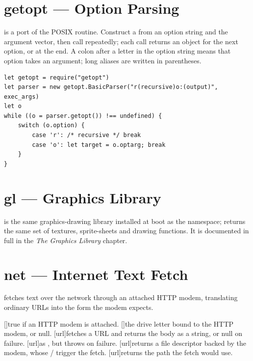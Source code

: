 \section{getopt --- Option Parsing}

 is a port of the POSIX  routine. Construct a  from an option string and the argument vector, then call  repeatedly; each call returns an object  for the next option, or  at the end. A colon after a letter in the option string means that option takes an argument; long aliases are written in parentheses.

\begin{lstlisting}
let getopt = require("getopt")
let parser = new getopt.BasicParser("r(recursive)o:(output)", exec_args)
let o
while ((o = parser.getopt()) !== undefined) {
    switch (o.option) {
        case 'r': /* recursive */ break
        case 'o': let target = o.optarg; break
    }
}
\end{lstlisting}

\section{gl --- Graphics Library}

 is the same graphics-drawing library installed at boot as the  namespace;  returns the same set of textures, sprite-sheets and drawing functions. It is documented in full in the \emph{The Graphics Library} chapter.

\section{net --- Internet Text Fetch}

 fetches text over the network through an attached HTTP modem, translating ordinary URLs into the form the modem expects.

\begin{outline}
\1[]{true if an HTTP modem is attached.}
\1[]{the drive letter bound to the HTTP modem, or null.}
\1[url]{fetches a URL and returns the body as a string, or null on failure.}
\1[url]{as , but throws on failure.}
\1[url]{returns a file descriptor backed by the modem, whose / trigger the fetch.}
\1[url]{returns the  path the fetch would use.}
\end{outline}

